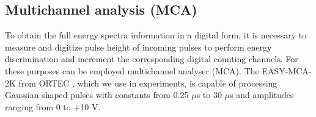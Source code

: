 \subsection{Multichannel analysis (MCA)}
To obtain the full energy spectra information in a digital form, it is necessary to measure and digitize pulse height of incoming pulses to perform energy discrimination and increment the corresponding digital counting channels. For these purposes can be employed multichannel analyser (MCA). The EASY-MCA-2K from ORTEC \cite{MCAOrtec}, which we use in experiments, is capable of processing Gaussian shaped pulses with constants from 0.25 $\mu$s to 30 $\mu$s and amplitudes ranging from 0 to +10 V.



